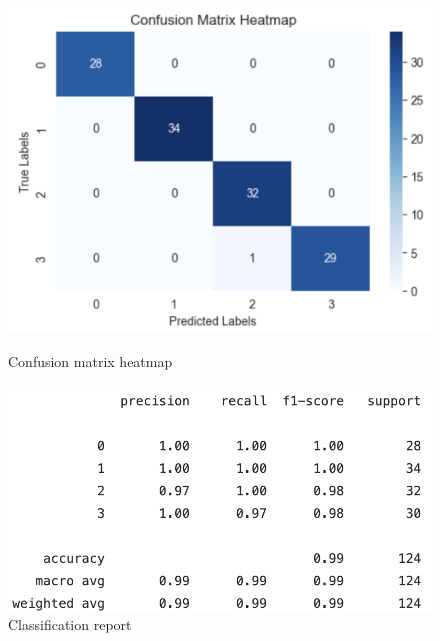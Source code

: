 \begin{figure}[H]
    \centering
    \begin{minipage}{0.48\textwidth}
        \centering
        \includegraphics[scale=0.25]{src/images/heatmap_metric.png}
        \vspace{-0.3cm}
        \caption{Confusion matrix heatmap}
        \label{fig:heatmap}
    \end{minipage}
    \hfill
    \begin{minipage}{0.48\textwidth}
        \centering
        \vspace{0.4cm}
        \includegraphics[scale=0.33]{src/images/cnn_report.png}
        \vspace{0.15cm}
        \caption{Classification report}
        \label{fig:report}
    \end{minipage}
\end{figure}




